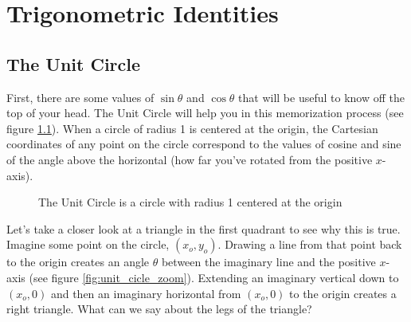 \chapter{Trigonometric Identities}

\section{The Unit Circle}
First, there are some values of $\sin{\theta}$ and $\cos{\theta}$ that will be 
useful to know off the top of your head. The Unit Circle will help you in this 
memorization process (see figure \ref{fig:unit_cicle_blank}). When a circle of 
radius 1 is centered at the origin, the Cartesian coordinates of any point on 
the circle correspond to the values of cosine and sine of the angle above 
the horizontal (how far you've rotated from the positive $x$-axis). 

\begin{figure}[htbp]
    \centering
    \caption{The Unit Circle is a circle with radius 1 centered at the origin}
    \label{fig:unit_cicle_blank}
\end{figure}

Let's take a closer look at a triangle in the first quadrant to see why this 
is true. Imagine some point on the circle, $(x_o, y_o)$. Drawing a line from 
that point back to the origin creates an angle $\theta$ between the imaginary 
line and the positive $x$-axis (see figure \ref{fig:unit_cicle_zoom}). 
Extending an imaginary vertical down to $(x_o, 0)$ and then an imaginary 
horizontal from $(x_o, 0)$ to the origin creates a right triangle. What can we 
say about the legs of the triangle?

